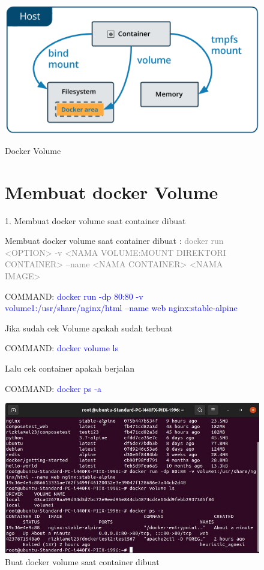 \begin{figure}
    \begin{center}
        \includegraphics[width=\linewidth]{image/volume.png}
        \caption{Docker Volume}
        \label{fig:my_figure}
    \end{center}
    
    \section{Membuat docker Volume}
    1. Membuat docker volume saat container dibuat
    
    Membuat docker volume saat container dibuat : \textcolor{Gray}{docker run <OPTION> -v <NAMA VOLUME:MOUNT DIREKTORI CONTAINER> --name <NAMA CONTAINER> <NAMA IMAGE>}
    
    COMMAND: \textcolor{Blue}{docker run -dp 80:80 -v volume1:/usr/share/nginx/html --name web nginx:stable-alpine}
    
    Jika sudah cek Volume apakah sudah terbuat
    
    COMMAND: \textcolor{Blue}{docker volume ls}
    
    Lalu cek container apakah berjalan
    
    COMMAND: \textcolor{Blue}{docker ps -a}
    \begin{center}
        \includegraphics[width=\linewidth]{image/38.jpg}
        \caption{Buat docker volume saat container dibuat}
        \label{fig:my_figure}
    \end{center}

    
\end{figure}
